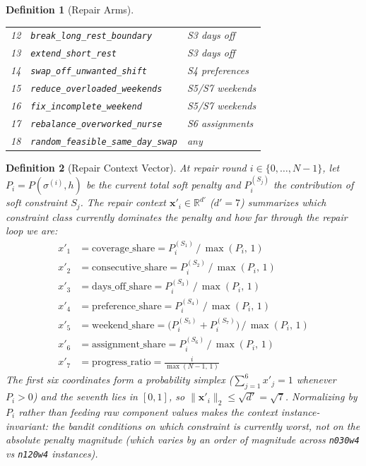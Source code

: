 \documentclass[11pt]{article}
\newtheorem{definition}{Definition}
\begin{document}
\begin{definition}[Repair Arms]
\begin{center}
\begin{tabular}{cll}
    12 & \texttt{break\_long\_rest\_boundary}         & S3 days off \\
    13 & \texttt{extend\_short\_rest}                 & S3 days off \\
    14 & \texttt{swap\_off\_unwanted\_shift}          & S4 preferences \\
    15 & \texttt{reduce\_overloaded\_weekends}        & S5/S7 weekends \\
    16 & \texttt{fix\_incomplete\_weekend}            & S5/S7 weekends \\
    17 & \texttt{rebalance\_overworked\_nurse}        & S6 assignments \\
    18 & \texttt{random\_feasible\_same\_day\_swap}   & any \\
    \bottomrule
  \end{tabular}
  \end{center}
\end{definition}

\begin{definition}[Repair Context Vector]
  At repair round $i \in \{0,\ldots,N-1\}$, let
  $P_i = P(\sigma^{(i)}, h)$ be the current total soft penalty and
  $P_i^{(S_j)}$ the contribution of soft constraint $S_j$. The repair
  context $\mathbf{x}'_i \in \mathbb{R}^{d'}$ ($d' = 7$) summarizes
  \emph{which} constraint class currently dominates the penalty and
  how far through the repair loop we are:
  \begin{align*}
    x'_1 &= \text{coverage\_share}
         = P_i^{(S_1)} \,/\, \max(P_i,\, 1) \\
    x'_2 &= \text{consecutive\_share}
         = P_i^{(S_2)} \,/\, \max(P_i,\, 1) \\
    x'_3 &= \text{days\_off\_share}
         = P_i^{(S_3)} \,/\, \max(P_i,\, 1) \\
    x'_4 &= \text{preference\_share}
         = P_i^{(S_4)} \,/\, \max(P_i,\, 1) \\
    x'_5 &= \text{weekend\_share}
         = \bigl(P_i^{(S_5)} + P_i^{(S_7)}\bigr) \,/\, \max(P_i,\, 1) \\
    x'_6 &= \text{assignment\_share}
         = P_i^{(S_6)} \,/\, \max(P_i,\, 1) \\
    x'_7 &= \text{progress\_ratio}
         = \frac{i}{\max(N - 1,\, 1)}
  \end{align*}
  The first six coordinates form a probability simplex
  ($\sum_{j=1}^{6} x'_j = 1$ whenever $P_i > 0$) and the seventh lies
  in $[0,1]$, so $\|\mathbf{x}'_i\|_2 \leq \sqrt{d'} = \sqrt{7}$.
  Normalizing by $P_i$ rather than feeding raw component values makes
  the context instance-invariant: the bandit conditions on
  \emph{which} constraint is currently worst, not on the absolute
  penalty magnitude (which varies by an order of magnitude across
  \texttt{n030w4} vs \texttt{n120w4} instances).
\end{definition}
\end{document}

